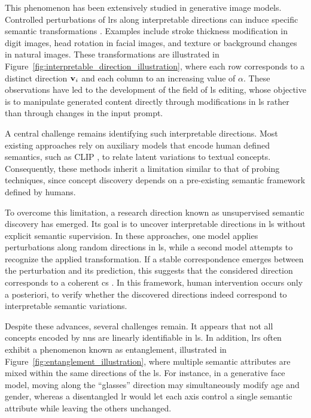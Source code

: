 

This phenomenon has been extensively studied in generative image models.
Controlled perturbations of \glspl{lr} along interpretable directions can induce specific semantic transformations \parencite{voynov2020unsuperviseddiscoveryinterpretabledirections}.
Examples include stroke thickness modification in digit images, head rotation in facial images, and texture or background changes in natural images.
These transformations are illustrated in Figure~\ref{fig:interpretable_direction_illustration}, where each row corresponds to a distinct direction $\mathbf{v}_i$ and each column to an increasing value of $\alpha$.
These observations have led to the development of the field of \gls{ls} editing, whose objective is to manipulate generated content directly through modifications in \gls{ls} rather than through changes in the input prompt.



A central challenge remains identifying such interpretable directions.
Most existing approaches rely on auxiliary models that encode human defined semantics, such as CLIP \parencite{haas2024discovering}, to relate latent variations to textual concepts.
Consequently, these methods inherit a limitation similar to that of probing techniques, since concept discovery depends on a pre-existing semantic framework defined by humans.

To overcome this limitation, a research direction known as unsupervised semantic discovery has emerged.
Its goal is to uncover interpretable directions in \gls{ls} without explicit semantic supervision.
In these approaches, one model applies perturbations along random directions in \gls{ls}, while a second model attempts to recognize the applied transformation.
If a stable correspondence emerges between the perturbation and its prediction, this suggests that the considered direction corresponds to a coherent \gls{cs} \parencite{voynov2020unsuperviseddiscoveryinterpretabledirections}.
In this framework, human intervention occurs only a posteriori, to verify whether the discovered directions indeed correspond to interpretable semantic variations.

Despite these advances, several challenges remain.
It appears that not all concepts encoded by \glspl{nn} are linearly identifiable in \gls{ls}.
In addition, \glspl{lr} often exhibit a phenomenon known as entanglement, illustrated in Figure~\ref{fig:entanglement_illustration}, where multiple semantic attributes are mixed within the same directions of the \gls{ls}.
For instance, in a generative face model, moving along the \enquote{glasses} direction may simultaneously modify age and gender, whereas a disentangled \gls{lr} would let each axis control a single semantic attribute while leaving the others unchanged.

